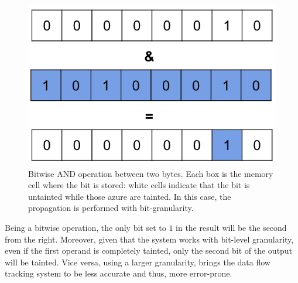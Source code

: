 \documentclass[LaM,binding=0.6cm]{sapthesis}
\begin{document}
\begin{figure}[h!]
\centering
\includegraphics[scale=.5]{images/techn2}
\caption{Bitwise AND operation between two bytes. Each box is the memory cell where the bit is stored: white cells indicate that the bit is untainted while those azure are tainted. In this case, the propagation is performed with bit-granularity.}
\end{figure}

Being a bitwise operation, the only bit set to $1$ in the result will be the second from the right. Moreover, given that the system works with bit-level granularity, even if the first operand is completely tainted, only the second bit of the output will be tainted. Vice versa, using a larger granularity, brings the data flow tracking system to be less accurate and thus, more error-prone.
\end{document}
